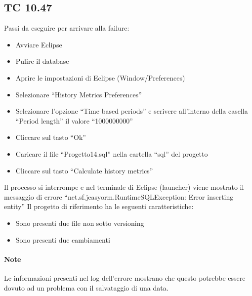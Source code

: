 \subsection*{TC 10.47}
Passi da eseguire per arrivare alla failure:
\begin{itemize}
 \item Avviare Eclipse
 \item Pulire il database
 \item Aprire le impostazioni di Eclipse (Window/Preferences)
 \item Selezionare ``History Metrics Preferences''
 \item Selezionare l'opzione ``Time based periods'' e scrivere all'interno della casella ``Period length'' il valore ``1000000000''
 \item Cliccare sul tasto ``Ok''
 \item Caricare il file ``Progetto14.sql'' nella cartella ``sql'' del progetto
 \item Cliccare sul tasto ``Calculate history metrics''
\end{itemize}
Il processo si interrompe e nel terminale di Eclipse (launcher) viene mostrato il messaggio di errore ``net.sf.jeasyorm.RuntimeSQLException: Error inserting entity''
\newline
Il progetto di riferimento ha le seguenti caratteristiche:
\begin{itemize}
 \item Sono presenti due file non sotto versioning
 \item Sono presenti due cambiamenti
\end{itemize}

\paragraph{Note} Le informazioni presenti nel log dell'errore mostrano che questo potrebbe essere dovuto ad un problema con il salvataggio di una data.





\newpage






